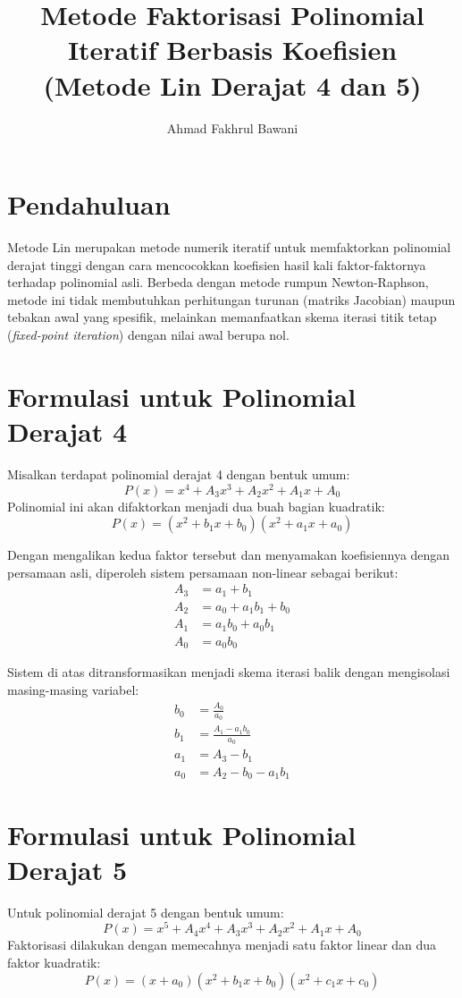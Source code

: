 \documentclass[12pt,a4paper]{article}
\title{Metode Faktorisasi Polinomial Iteratif Berbasis Koefisien \\ (Metode Lin Derajat 4 dan 5)}
\author{Ahmad Fakhrul Bawani}
\date{}
\begin{document}
\maketitle

\section{Pendahuluan}
Metode Lin merupakan metode numerik iteratif untuk memfaktorkan polinomial derajat tinggi dengan cara mencocokkan koefisien hasil kali faktor-faktornya terhadap polinomial asli. Berbeda dengan metode rumpun Newton-Raphson, metode ini tidak membutuhkan perhitungan turunan (matriks Jacobian) maupun tebakan awal yang spesifik, melainkan memanfaatkan skema iterasi titik tetap (\textit{fixed-point iteration}) dengan nilai awal berupa nol.

\section{Formulasi untuk Polinomial Derajat 4}
Misalkan terdapat polinomial derajat 4 dengan bentuk umum:
\begin{equation}
P(x) = x^4 + A_3x^3 + A_2x^2 + A_1x + A_0
\end{equation}
Polinomial ini akan difaktorkan menjadi dua buah bagian kuadratik:
\begin{equation}
P(x) = (x^2 + b_1x + b_0)(x^2 + a_1x + a_0)
\end{equation}

Dengan mengalikan kedua faktor tersebut dan menyamakan koefisiennya dengan persamaan asli, diperoleh sistem persamaan non-linear sebagai berikut:
\begin{align}
A_3 &= a_1 + b_1 \\
A_2 &= a_0 + a_1b_1 + b_0 \\
A_1 &= a_1b_0 + a_0b_1 \\
A_0 &= a_0b_0
\end{align}

Sistem di atas ditransformasikan menjadi skema iterasi balik dengan mengisolasi masing-masing variabel:
\begin{align}
b_0 &= \frac{A_0}{a_0} \\
b_1 &= \frac{A_1 - a_1b_0}{a_0} \\
a_1 &= A_3 - b_1 \\
a_0 &= A_2 - b_0 - a_1b_1
\end{align}

\section{Formulasi untuk Polinomial Derajat 5}
Untuk polinomial derajat 5 dengan bentuk umum:
\begin{equation}
P(x) = x^5 + A_4x^4 + A_3x^3 + A_2x^2 + A_1x + A_0
\end{equation}
Faktorisasi dilakukan dengan memecahnya menjadi satu faktor linear dan dua faktor kuadratik:
\begin{equation}
P(x) = (x + a_0)(x^2 + b_1x + b_0)(x^2 + c_1x + c_0)
\end{equation}
\end{document}

